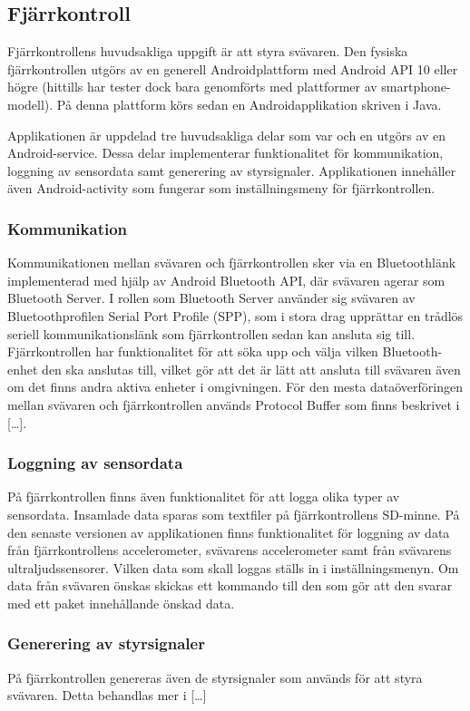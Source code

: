 \subsection{Fjärrkontroll}
Fjärrkontrollens huvudsakliga uppgift är att styra svävaren. Den fysiska fjärrkontrollen utgörs av en generell Androidplattform med Android API 10 eller högre (hittills har tester dock bara genomförts med plattformer av smartphone-modell). På denna plattform körs sedan en Androidapplikation skriven i Java. 

Applikationen är uppdelad tre huvudsakliga delar som var och en utgörs av en Android-service. Dessa delar implementerar funktionalitet för kommunikation, loggning av sensordata samt generering av styrsignaler. Applikationen innehåller även Android-activity som fungerar som inställningsmeny för fjärrkontrollen.

\subsubsection{Kommunikation}
Kommunikationen mellan svävaren och fjärrkontrollen sker via en Bluetoothlänk implementerad med hjälp av Android Bluetooth API, där svävaren agerar som Bluetooth Server. I rollen som Bluetooth Server använder sig svävaren av Bluetoothprofilen Serial Port Profile (SPP), som i stora drag upprättar en trådlös seriell kommunikationslänk som fjärrkontrollen sedan kan ansluta sig till. 
Fjärrkontrollen har funktionalitet för att söka upp och välja vilken Bluetooth-enhet den ska anslutas till, vilket gör att det är lätt att ansluta till svävaren även om det finns andra aktiva enheter i omgivningen.
För den mesta dataöverföringen mellan svävaren och fjärrkontrollen används Protocol Buffer som finns beskrivet i […].

\subsubsection{Loggning av sensordata}
På fjärrkontrollen finns även funktionalitet för att logga olika typer av sensordata. Insamlade data sparas som textfiler på fjärrkontrollens SD-minne. 
På den senaste versionen av applikationen finns funktionalitet för loggning av data från fjärrkontrollens accelerometer, svävarens accelerometer samt från svävarens ultraljudssensorer. Vilken data som skall loggas ställs in i inställningsmenyn. Om data från svävaren önskas skickas ett kommando till den som gör att den svarar med ett paket innehållande önskad data. 

\subsubsection{Generering av styrsignaler}
På fjärrkontrollen genereras även de styrsignaler som används för att styra svävaren. Detta behandlas mer i […]

